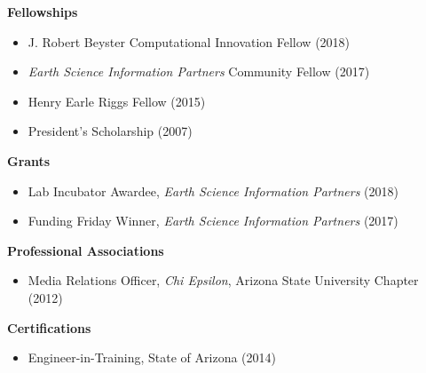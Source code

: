 
\textcolor{heading}{\textbf{Fellowships}}

\vspace{6pt}

\begin{itemize}
\item J. Robert Beyster Computational Innovation Fellow (2018)
\item \textit{Earth Science Information Partners} Community Fellow (2017)
\item Henry Earle Riggs Fellow (2015)
\item President's Scholarship (2007)
\end{itemize}

\vspace{6pt}

\textcolor{heading}{\textbf{Grants}}

\vspace{6pt}

\begin{itemize}
\item Lab Incubator Awardee, \textit{Earth Science Information Partners} (2018)
\item Funding Friday Winner, \textit{Earth Science Information Partners} (2017)
\end{itemize}

\vspace{6pt}

\textcolor{heading}{\textbf{Professional Associations}}

\vspace{6pt}

\begin{itemize}
\item Media Relations Officer, \textit{Chi Epsilon}, Arizona State
  University Chapter (2012)
\end{itemize}

\vspace{6pt}

\textcolor{heading}{\textbf{Certifications}}

\vspace{6pt}

\begin{itemize}
\item Engineer-in-Training, State of Arizona (2014) 
\end{itemize}




